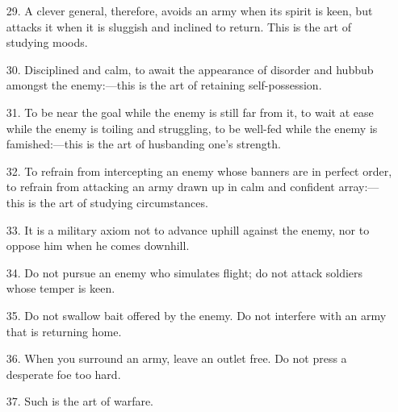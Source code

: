 \documentclass[11pt,openany]{memoir}
\newcommand{\enumeratemargin}{1.30em}
\begin{document}
\begin{enumerate}[leftmargin=\enumeratemargin]
\item[29.] A clever general, therefore, avoids an army when its spirit is keen, but attacks it when it is sluggish and inclined to return. This is the art of studying moods.
\item[30.] Disciplined and calm, to await the appearance of disorder and hubbub amongst the enemy:---this is the art of retaining self-possession.
\item[31.] To be near the goal while the enemy is still far from it, to wait at ease while the enemy is toiling and struggling, to be well-fed while the enemy is famished:---this is the art of husbanding one's strength.
\item[32.] To refrain from intercepting an enemy whose banners are in perfect order, to refrain from attacking an army drawn up in calm and confident array:---this is the art of studying circumstances.
\item[33.] It is a military axiom not to advance uphill against the enemy, nor to oppose him when he comes downhill.
\item[34.] Do not pursue an enemy who simulates flight; do not attack soldiers whose temper is keen.
\item[35.] Do not swallow bait offered by the enemy. Do not interfere with an army that is returning home.
\item[36.] When you surround an army, leave an outlet free. Do not press a desperate foe too hard.
\item[37.] Such is the art of warfare.
\end{enumerate}
\end{document}
